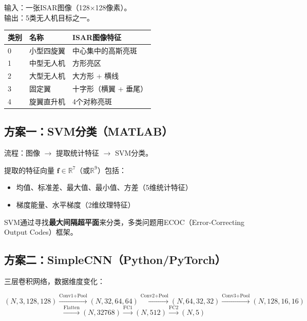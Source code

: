 \documentclass[12pt, a4paper]{article}
\newcommand{\mat}[1]{\boldsymbol{#1}}
\begin{document}
输入：一张ISAR图像（128×128像素）。\\
输出：5类无人机目标之一。

\begin{table}[H]
\centering
\begin{tabular}{lll}
\toprule
类别 & 名称 & ISAR图像特征 \\
\midrule
0 & 小型四旋翼 & 中心集中的高斯亮斑 \\
1 & 中型无人机 & 方形亮区 \\
2 & 大型无人机 & 大方形 + 横线 \\
3 & 固定翼 & 十字形（横翼 + 垂尾）\\
4 & 旋翼直升机 & 4个对称亮斑 \\
\bottomrule
\end{tabular}
\end{table}

\subsection{方案一：SVM分类（MATLAB）}

流程：图像 $\to$ 提取统计特征 $\to$ SVM分类。

提取的特征向量 $\mat{f} \in \mathbb{R}^7$（或$\mathbb{R}^9$）包括：
\begin{itemize}
  \item 均值、标准差、最大值、最小值、方差（5维统计特征）
  \item 梯度能量、水平梯度（2维纹理特征）
\end{itemize}

SVM通过寻找\textbf{最大间隔超平面}来分类，多类问题用ECOC（Error-Correcting Output Codes）框架。

\subsection{方案二：SimpleCNN（Python/PyTorch）}

三层卷积网络，数据维度变化：

\begin{equation*}
(N,3,128,128) \xrightarrow{\text{Conv1+Pool}} (N,32,64,64) \xrightarrow{\text{Conv2+Pool}} (N,64,32,32) \xrightarrow{\text{Conv3+Pool}} (N,128,16,16)
\end{equation*}
\begin{equation*}
\xrightarrow{\text{Flatten}} (N, 32768) \xrightarrow{\text{FC1}} (N, 512) \xrightarrow{\text{FC2}} (N, 5)
\end{equation*}
\end{document}
